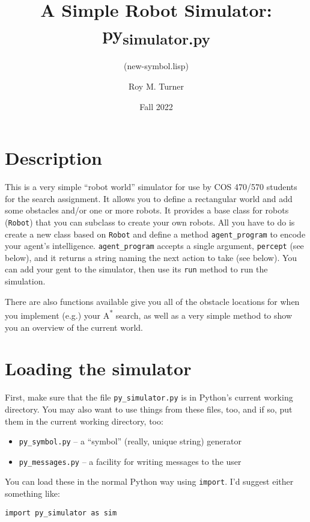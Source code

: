 \documentclass[11pt]{tufte-handout}
\subtitle{(new-symbol.lisp)}
\author{Roy M. Turner}
\date{Fall 2022}
\title{A Simple Robot Simulator: py\textsubscript{simulator.py}}
\begin{document}
\maketitle
\tableofcontents

\titlepage
\maketitle

\section{Description}
\label{sec:orgc68ff38}

This is a very simple ``robot world''  simulator for use by COS 470/570  students for the search assignment. It allows you to define a rectangular world and add some obstacles and/or one or more robots.  It provides a base class for robots (\texttt{Robot}) that you can subclass to create your own robots.  All you have to do is create a new class based on \texttt{Robot} and define a method \texttt{agent\_program} to encode your agent's intelligence.  \texttt{agent\_program} accepts a single argument, \texttt{percept} (see below), and it returns a string naming the next action to take (see below).  You can add your gent to the simulator, then use its \texttt{run} method to run the simulation.

There are also functions available give you all of the obstacle locations for when you implement (e.g.) your A\textsuperscript{*} search, as well as a very simple method to show you an overview of the current world.

\section{Loading the simulator}
\label{sec:org17ea02d}

First, make sure that the file \texttt{py\_simulator.py} is in Python's current working directory.  You may also want to use things from these files, too, and if so, put them in the current working directory, too:
\begin{itemize}
\item \texttt{py\_symbol.py} -- a ``symbol'' (really, unique string) generator
\item \texttt{py\_messages.py} -- a facility for writing messages to the user
\end{itemize}

You can load these in the normal Python way using \texttt{import}.  I'd suggest either something like:
\begin{verbatim}
import py_simulator as sim
\end{verbatim}
\end{document}
